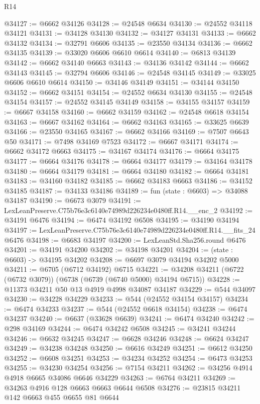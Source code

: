\begin{lexlean}{R14}
\begin{coremodule}
@34127 := @6662 @34126
@34128 := @24548 @6634
@34130 := @24552 @34118 @34121
@34131 := @34128 @34130
@34132 := @34127 @34131
@34133 := @6662 @34132
@34134 := @32791 @6606
@34135 := @23550 @34134
@34136 := @6662 @34135
@34139 := @33020 @6606 @6610 @6614
@34140 := @6813 @34139
@34142 := @6662 @34140 @6663
@34143 := @34136 @34142
@34144 := @6662 @34143
@34145 := @32794 @6606
@34146 := @24548 @34145
@34149 := @33025 @6606 @6610 @6614
@34150 := @34146 @34149
@34151 := @34144 @34150
@34152 := @6662 @34151
@34154 := @24552 @6634 @34130
@34155 := @24548 @34154
@34157 := @24552 @34145 @34149
@34158 := @34155 @34157
@34159 := @6667 @34158
@34160 := @6662 @34159
@34162 := @24548 @6618 @34154
@34163 := @6667 @34162
@34164 := @6662 @34163
@34165 := @33625 @6639
@34166 := @23550 @34165
@34167 := @6662 @34166
@34169 := @7507 @6643 @50
@34171 := @7498 @34169 @7523
@34172 := @6667 @34171
@34174 := @6662 @34172 @6663
@34175 := @34167 @34174
@34176 := @6664 @34175
@34177 := @6664 @34176
@34178 := @6664 @34177
@34179 := @34164 @34178
@34180 := @6664 @34179
@34181 := @6664 @34180
@34182 := @6664 @34181
@34183 := @34160 @34182
@34185 := @6662 @34183 @6663
@34186 := @34152 @34185
@34187 := @34133 @34186
@34189 := fun (state : @6603) => @34088 @34187
@34190 := @6673 @3079
@34191 := LexLeanPreserve.C75b76e3c6140e74989d226234e0480ff.R14.__enc_2
@34192 := @34191 @6476
@34194 := @6474 @34192 @6508
@34195 := @34190 @34194
@34197 := LexLeanPreserve.C75b76e3c6140e74989d226234e0480ff.R14.__fits_24 @6476
@34198 := @6683 @34197
@34200 := LexLeanStd.Sha256.round @6476
@34201 := @34191 @34200
@34202 := @34198 @34201
@34204 := (state : @6603) -> @34195 @34202
@34208 := @6697 @3079 @34194 @34202 @5000
@34211 := @6705 (@6712 @34192) @6715
@34221 := @34208 @34211 (@6722 (@6732 @3079)) (@6738 (@6739 (@6740 @5000) @34194 @6715))
@34228 := @11373 @34211 @50 @13 @4919 @4998 @34087 @34187
@34229 := @544 @34097
@34230 := @34228 @34229
@34233 := @544 (@24552 @34154 @34157)
@34234 := @6474 @34233
@34237 := @544 (@24552 @6618 @34154)
@34238 := @6474 @34237
@34240 := @6637 (@33628 @6639)
@34241 := @6474 @34240
@34242 := @298 @34169
@34244 := @6474 @34242 @6508
@34245 := @34241 @34244
@34246 := @6632 @34245
@34247 := @6628 @34246
@34248 := @6624 @34247
@34249 := @34238 @34248
@34250 := @6616 @34249
@34251 := @6612 @34250
@34252 := @6608 @34251
@34253 := @34234 @34252
@34254 := @6473 @34253
@34255 := @34230 @34254
@34256 := @7154 @34211
@34262 := @34256 @4914 @4918 @6665 @34086 @6646 @34229
@34263 := @6764 @34211
@34269 := @34263 @4916 @128 @6663 @6663 @6644 @6508
@34276 := @23815 @34211 @142 @6663 @455 @6655 @81 @6644

\end{coremodule}
\end{lexlean}
